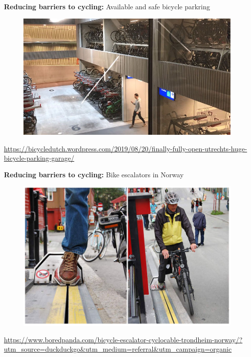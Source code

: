 \documentclass[aspectratio=169]{beamer}
\begin{document}
\begin{frame}
	
	\textbf{Reducing barriers to cycling:} Available and safe bicycle parkring
	
	\begin{figure}
		\centering
		\includegraphics[width=0.85\linewidth]{images/bike_parking_neth.jpg}
	\end{figure}
	
	\tiny\url{https://bicycledutch.wordpress.com/2019/08/20/finally-fully-open-utrechts-huge-bicycle-parking-garage/}
	
\end{frame}



\begin{frame}
	
	\textbf{Reducing barriers to cycling:} Bike escalators in Norway
	
	\begin{figure}
		\centering
		\includegraphics[width=0.85\linewidth]{images/norway_bike_escalator.png}
	\end{figure}
	
	\tiny\url{https://www.boredpanda.com/bicycle-escalator-cyclocable-trondheim-norway/?utm_source=duckduckgo&utm_medium=referral&utm_campaign=organic}
	
\end{frame}
\end{document}
